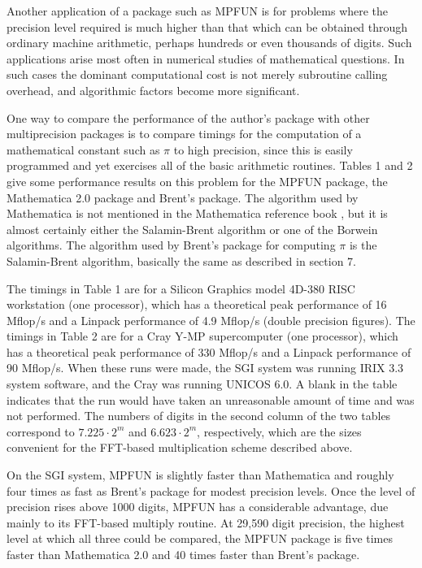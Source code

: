 Another application of a package such as MPFUN is for problems where
the precision level required is much higher than that which can be
obtained through ordinary machine arithmetic, perhaps hundreds or even
thousands of digits.  Such applications arise most often in numerical
studies of mathematical questions.  In such cases the dominant
computational cost is not merely subroutine calling overhead, and
algorithmic factors become more significant.

One way to compare the performance of the author's package with other
multiprecision packages is to compare timings for the computation of a
mathematical constant such as $\pi$ to high precision, since this is
easily programmed and yet exercises all of the basic arithmetic
routines.  Tables 1 and 2 give some performance results on this
problem for the MPFUN package, the Mathematica 2.0 package and Brent's
package.  The algorithm used by Mathematica is not mentioned in the
Mathematica reference book \cite{mathem}, but it is almost certainly
either the Salamin-Brent algorithm or one of the Borwein algorithms.
The algorithm used by Brent's package for computing $\pi$ is the
Salamin-Brent algorithm, basically the same as described in section 7.

The timings in Table 1 are for a Silicon Graphics model 4D-380 RISC
workstation (one processor), which has a theoretical peak performance
of 16 Mflop/s and a Linpack performance of 4.9 Mflop/s (double precision
figures).  The timings in Table 2 are for a Cray Y-MP supercomputer
(one processor), which has a theoretical peak performance of 330
Mflop/s and a Linpack performance of 90 Mflop/s.  When these runs were
made, the SGI system was running IRIX 3.3 system software, and the
Cray was running UNICOS 6.0.  A blank in the table indicates that the
run would have taken an unreasonable amount of time and was not
performed.  The numbers of digits in the second column of the two
tables correspond to $7.225 \cdot 2^m$ and $6.623 \cdot 2^m$,
respectively, which are the sizes convenient for the FFT-based
multiplication scheme described above.

On the SGI system, MPFUN is slightly faster than Mathematica and
roughly four times as fast as Brent's package for modest precision
levels.  Once the level of precision rises above 1000 digits, MPFUN
has a considerable advantage, due mainly to its FFT-based multiply
routine.  At 29,590 digit precision, the highest level at which all
three could be compared, the MPFUN package is five times faster than
Mathematica 2.0 and 40 times faster than Brent's package.

